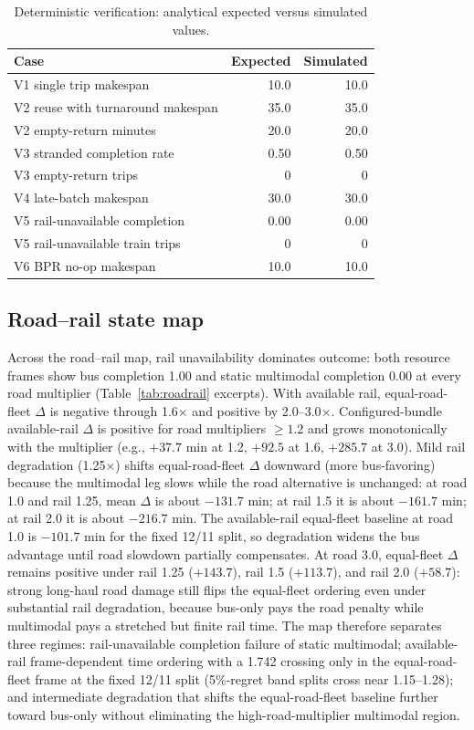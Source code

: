 \documentclass{ieeeaccess}
\begin{document}
\begin{table}[!t]
\caption{Deterministic verification: analytical expected versus simulated values.}
\label{tab:verify}
\centering
\footnotesize
\begin{tabular}{@{}lrr@{}}
\hline
Case & Expected & Simulated \\
\hline
V1 single trip makespan & 10.0 & 10.0 \\
V2 reuse with turnaround makespan & 35.0 & 35.0 \\
V2 empty-return minutes & 20.0 & 20.0 \\
V3 stranded completion rate & 0.50 & 0.50 \\
V3 empty-return trips & 0 & 0 \\
V4 late-batch makespan & 30.0 & 30.0 \\
V5 rail-unavailable completion & 0.00 & 0.00 \\
V5 rail-unavailable train trips & 0 & 0 \\
V6 BPR no-op makespan & 10.0 & 10.0 \\
\hline
\end{tabular}
\end{table}

\subsection{Road--rail state map}
Across the road--rail map, rail unavailability dominates outcome: both resource frames show bus completion 1.00 and static multimodal completion 0.00 at every road multiplier (Table~\ref{tab:roadrail} excerpts). With available rail, equal-road-fleet $\Delta$ is negative through 1.6$\times$ and positive by 2.0--3.0$\times$. Configured-bundle available-rail $\Delta$ is positive for road multipliers $\ge 1.2$ and grows monotonically with the multiplier (e.g., $+37.7$ min at 1.2, $+92.5$ at 1.6, $+285.7$ at 3.0). Mild rail degradation (1.25$\times$) shifts equal-road-fleet $\Delta$ downward (more bus-favoring) because the multimodal leg slows while the road alternative is unchanged: at road 1.0 and rail 1.25, mean $\Delta$ is about $-131.7$ min; at rail 1.5 it is about $-161.7$ min; at rail 2.0 it is about $-216.7$ min. The available-rail equal-fleet baseline at road 1.0 is $-101.7$ min for the fixed 12/11 split, so degradation widens the bus advantage until road slowdown partially compensates. At road 3.0, equal-fleet $\Delta$ remains positive under rail 1.25 ($+143.7$), rail 1.5 ($+113.7$), and rail 2.0 ($+58.7$): strong long-haul road damage still flips the equal-fleet ordering even under substantial rail degradation, because bus-only pays the road penalty while multimodal pays a stretched but finite rail time. The map therefore separates three regimes: rail-unavailable completion failure of static multimodal; available-rail frame-dependent time ordering with a 1.742 crossing only in the equal-road-fleet frame at the fixed 12/11 split (5\%-regret band splits cross near 1.15--1.28); and intermediate degradation that shifts the equal-road-fleet baseline further toward bus-only without eliminating the high-road-multiplier multimodal region.
\end{document}
